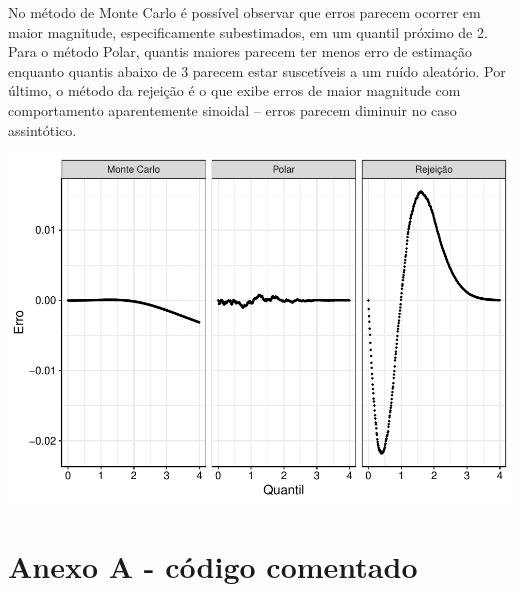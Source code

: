 \documentclass[
]{article}
\begin{document}
No método de Monte Carlo é possível observar que erros parecem ocorrer
em maior magnitude, especificamente subestimados, em um quantil próximo
de 2. Para o método Polar, quantis maiores parecem ter menos erro de
estimação enquanto quantis abaixo de 3 parecem estar suscetíveis a um
ruído aleatório. Por último, o método da rejeição é o que exibe erros de
maior magnitude com comportamento aparentemente sinoidal -- erros
parecem diminuir no caso assintótico.

\includegraphics{relatorio_tp2_files/figure-latex/erros-estimacao-1.pdf}

\hypertarget{anexo-a---cuxf3digo-comentado}{%
\section*{Anexo A - código
comentado}\label{anexo-a---cuxf3digo-comentado}}
\end{document}
